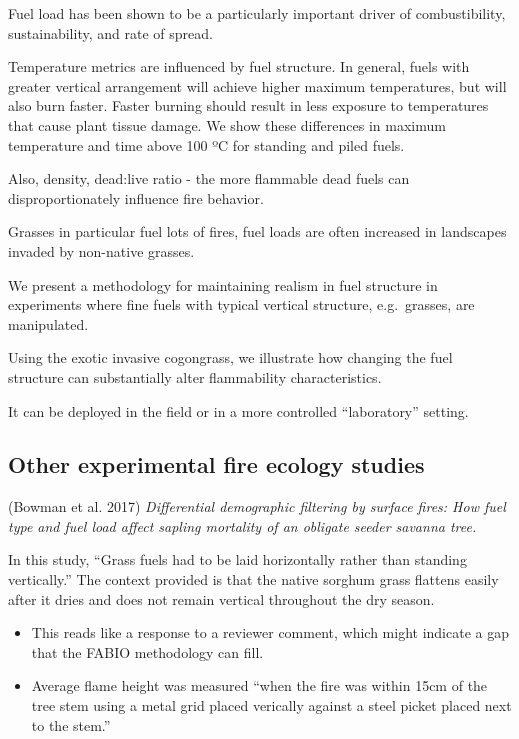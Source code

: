 \documentclass[11pt,a4paper]{article}
\begin{document}
Fuel load has been shown to be a particularly important driver of
combustibility, sustainability, and rate of spread.

Temperature metrics are influenced by fuel structure. In general, fuels
with greater vertical arrangement will achieve higher maximum
temperatures, but will also burn faster. Faster burning should result in
less exposure to temperatures that cause plant tissue damage. We show
these differences in maximum temperature and time above 100 ºC for
standing and piled fuels.

Also, density, dead:live ratio - the more flammable dead fuels can
disproportionately influence fire behavior.

Grasses in particular fuel lots of fires, fuel loads are often increased
in landscapes invaded by non-native grasses.

We present a methodology for maintaining realism in fuel structure in
experiments where fine fuels with typical vertical structure,
e.g.~grasses, are manipulated.

Using the exotic invasive cogongrass, we illustrate how changing the
fuel structure can substantially alter flammability characteristics.

It can be deployed in the field or in a more controlled ``laboratory''
setting.

\hypertarget{other-experimental-fire-ecology-studies}{%
\subsection{Other experimental fire ecology
studies}\label{other-experimental-fire-ecology-studies}}

(Bowman et al. 2017) \emph{Differential demographic filtering by surface
fires: How fuel type and fuel load affect sapling mortality of an
obligate seeder savanna tree.}

In this study, ``Grass fuels had to be laid horizontally rather than
standing vertically.'' The context provided is that the native sorghum
grass flattens easily after it dries and does not remain vertical
throughout the dry season.

\begin{itemize}
\item
  This reads like a response to a reviewer comment, which might indicate
  a gap that the FABIO methodology can fill.
\item
  Average flame height was measured ``when the fire was within 15cm of
  the tree stem using a metal grid placed verically against a steel
  picket placed next to the stem.''
\end{itemize}
\end{document}
